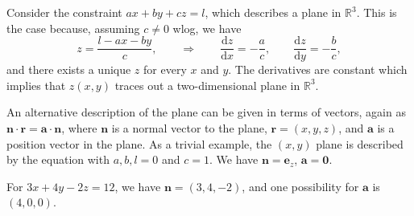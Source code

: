 \documentclass[letter-paper]{tufte-book}
\newenvironment{example}[1][Example]{\begin{trivlist}
\item[\hskip \labelsep {\bfseries #1}]}{\end{trivlist}}
\newcommand{\ab}{\boldsymbol{a}}
\newcommand{\eb}{\boldsymbol{e}}
\newcommand{\nb}{\boldsymbol{n}}
\begin{document}
Consider the constraint $ax+by+cz=l$, which describes a plane in $\mathbb{R}^3$.
This is the case because, assuming $c\neq0$ wlog, we have
\begin{equation*}
	z=\frac{l-ax-by}{c},\qquad\Rightarrow\qquad
	\frac{\mathrm{d} z}{\mathrm{d} x}=-\frac{a}{c},\qquad\frac{\mathrm{d} z}{\mathrm{d} y}=-\frac{b}{c},
\end{equation*}
and there exists a unique $z$ for every $x$ and $y$. The derivatives are
constant which implies that $z(x,y)$ traces out a two-dimensional plane in
$\mathbb{R}^3$.

An alternative description of the plane can be given in terms of vectors, again
as $\nb\cdot\boldsymbol{r}=\ab\cdot\nb$, where $\nb$ is a normal vector to the
plane, $\boldsymbol{r}=(x,y,z)$, and $\ab$ is a position vector in the plane. As
a trivial example, the $(x,y)$ plane is described by the equation with $a,b,l=0$
and $c=1$. We have $\nb=\eb_z$, $\ab=\boldsymbol{0}$.
\begin{example}
	For $3x+4y-2z=12$, we have $\nb=(3,4,-2)$, and one possibility for $\ab$ is
	$(4,0,0)$.
\end{example}
\end{document}
